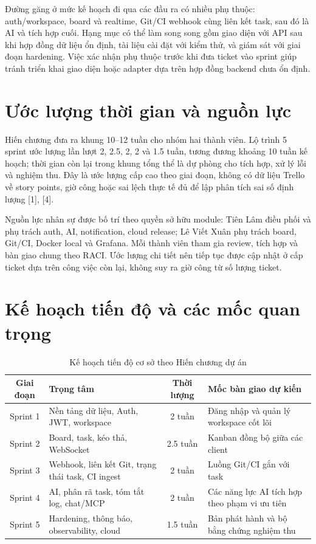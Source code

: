\documentclass[12pt,a4paper]{report}
\begin{document}
Đường găng ở mức kế hoạch đi qua các đầu ra có nhiều phụ thuộc: auth/workspace, board và realtime, Git/CI webhook cùng liên kết task, sau đó là AI và tích hợp cuối. Hạng mục có thể làm song song gồm giao diện với API sau khi hợp đồng dữ liệu ổn định, tài liệu cài đặt với kiểm thử, và giám sát với giai đoạn hardening. Việc xác nhận phụ thuộc trước khi đưa ticket vào sprint giúp tránh triển khai giao diện hoặc adapter dựa trên hợp đồng backend chưa ổn định.

\section{Ước lượng thời gian và nguồn lực}
Hiến chương đưa ra khung 10–12 tuần cho nhóm hai thành viên. Lộ trình 5 sprint ước lượng lần lượt 2, 2.5, 2, 2 và 1.5 tuần, tương đương khoảng 10 tuần kế hoạch; thời gian còn lại trong khung tổng thể là dự phòng cho tích hợp, xử lý lỗi và nghiệm thu. Đây là ước lượng cấp cao theo giai đoạn, không có dữ liệu Trello về story points, giờ công hoặc sai lệch thực tế đủ để lập phân tích sai số định lượng [1], [4].

Nguồn lực nhân sự được bố trí theo quyền sở hữu module: Tiên Lâm điều phối và phụ trách auth, AI, notification, cloud release; Lê Viết Xuân phụ trách board, Git/CI, Docker local và Grafana. Mỗi thành viên tham gia review, tích hợp và bàn giao chung theo RACI. Ước lượng chi tiết nên tiếp tục được cập nhật ở cấp ticket dựa trên công việc còn lại, không suy ra giờ công từ số lượng ticket.

\section{Kế hoạch tiến độ và các mốc quan trọng}
\begin{table}[H]
\centering
\caption{Kế hoạch tiến độ cơ sở theo Hiến chương dự án}
\begin{tabularx}{\textwidth}{|c|X|c|X|}
\hline
\textbf{Giai đoạn} & \textbf{Trọng tâm} & \textbf{Thời lượng} & \textbf{Mốc bàn giao dự kiến} \\
\hline
Sprint 1 & Nền tảng dữ liệu, Auth, JWT, workspace & 2 tuần & Đăng nhập và quản lý workspace cốt lõi \\
Sprint 2 & Board, task, kéo thả, WebSocket & 2.5 tuần & Kanban đồng bộ giữa các client \\
Sprint 3 & Webhook, liên kết Git, trạng thái task, CI ingest & 2 tuần & Luồng Git/CI gắn với task \\
Sprint 4 & AI, phân rã task, tóm tắt log, chat/MCP & 2 tuần & Các năng lực AI tích hợp theo phạm vi ưu tiên \\
Sprint 5 & Hardening, thông báo, observability, cloud & 1.5 tuần & Bản phát hành và bộ bằng chứng nghiệm thu \\
\hline
\end{tabularx}
\end{table}
\end{document}

